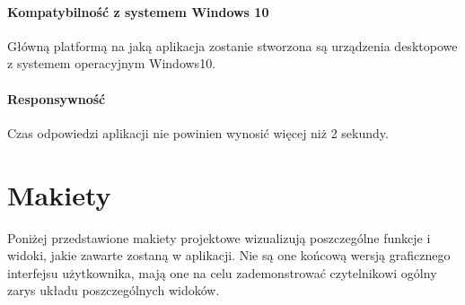 \paragraph{Kompatybilność z systemem Windows 10} Główną platformą na jaką aplikacja zostanie stworzona są urządzenia desktopowe z systemem operacyjnym Windows10.
\paragraph{Responsywność} Czas odpowiedzi aplikacji nie powinien wynosić więcej niż 2 sekundy. 





\section{Makiety}

Poniżej przedstawione makiety projektowe wizualizują poszczególne funkcje i widoki, jakie zawarte zostaną w aplikacji. 
Nie są one końcową wersją graficznego interfejsu użytkownika, mają one na celu zademonstrować czytelnikowi ogólny zarys układu poszczególnych widoków.

